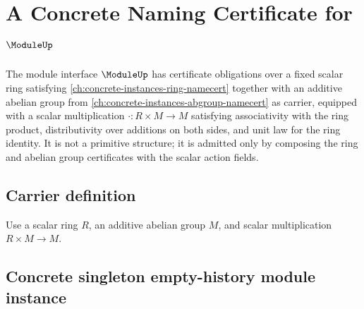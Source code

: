 \chapter{A Concrete Naming Certificate for $\ModuleUp$}
\label{ch:concrete-instances-module-namecert}

The module interface $\ModuleUp$ has certificate obligations over a fixed scalar ring satisfying \autoref{ch:concrete-instances-ring-namecert} together with an additive abelian group from \autoref{ch:concrete-instances-abgroup-namecert} as carrier, equipped with a scalar multiplication $\cdot : R \times M \to M$ satisfying associativity with the ring product, distributivity over additions on both sides, and unit law for the ring identity. It is not a primitive structure; it is admitted only by composing the ring and abelian group certificates with the scalar action fields.

\section{Carrier definition}

\begin{definition}
\label{def:module-carrier}
Use a scalar ring $R$, an additive abelian group $M$, and scalar multiplication $R\times M\to M$.
\end{definition}

\section{Concrete singleton empty-history module instance}
\label{sec:module-concrete-singleton-instance}

